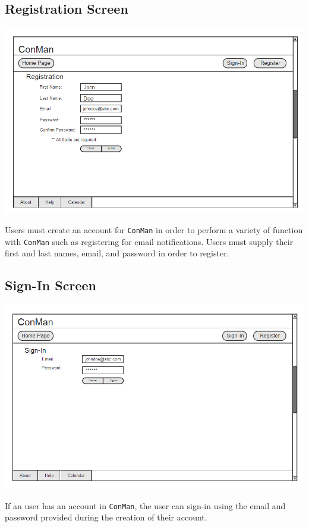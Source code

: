 \documentclass{article}
\begin{document}
\subsection{Registration Screen}
\begin{center}
\includegraphics[trim = 0cm 0cm 0cm 0cm, clip=true, scale=0.7]{images/Registration}
\end{center}
Users must create an account for \texttt{ConMan} in order to perform a variety of function with \texttt{ConMan} 
such as registering for email notifications. Users must supply their first and last names, email, and password in 
order to register.
\subsection{Sign-In Screen}
\begin{center}
\includegraphics[trim = 0cm 0cm 0cm 0cm, clip=true, scale=0.7]{images/SignIn}
\end{center}
If an user has an account in \texttt{ConMan}, the user can sign-in using the email and 
password provided during the creation of their account.
\end{document}

